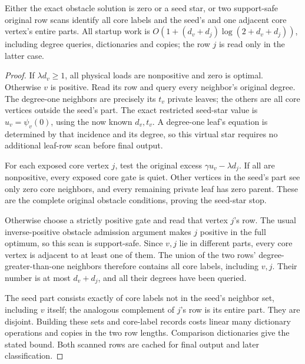 \begin{lemma}
\label{lem:op3-multipartite-startup}
Either the exact obstacle solution is zero or a seed star, or two
support-safe original row scans identify all core labels and the seed's
and one adjacent core vertex's entire parts. All startup work is
$O(1+(d_v+d_j)\log(2+d_v+d_j))$, including degree queries, dictionaries
and copies; the row $j$ is read only in the latter case.
\end{lemma}
\begin{proof}
If $\lambda d_v\geq1$, all physical loads are nonpositive and zero is
optimal. Otherwise $v$ is positive. Read its row and query every neighbor's
original degree. The degree-one neighbors are precisely its $t_v$ private
leaves; the others are all core vertices outside the seed's part.
The exact restricted seed-star value is
$u_v=\psi_v(0)$, using the now known $d_v,t_v$. A degree-one leaf's
equation is determined by that incidence and its degree, so this virtual
star requires no additional leaf-row scan before final output.

For each exposed core vertex $j$, test the original excess
$\gamma u_v-\lambda d_j$. If all are nonpositive, every exposed core
gate is quiet. Other vertices in the seed's part see only zero core
neighbors, and every remaining private leaf has zero parent. These are
the complete original obstacle conditions, proving the seed-star stop.

Otherwise choose a strictly positive gate and read that vertex $j$'s row.
The usual inverse-positive obstacle admission argument makes $j$ positive
in the full optimum, so this scan is support-safe. Since $v,j$ lie in
different parts, every core vertex is adjacent to at least one of them.
The union of the two rows' degree-greater-than-one neighbors therefore
contains all core labels, including $v,j$. Their number is at most
$d_v+d_j$, and all their degrees have been queried.

The seed part consists exactly of core labels not in the seed's neighbor
set, including $v$ itself; the analogous complement of $j$'s row is its
entire part. They are disjoint. Building these sets and core-label records
costs linear many dictionary operations and copies in the two row lengths.
Comparison dictionaries give the stated bound. Both scanned rows are cached
for final output and later classification.
\end{proof}

